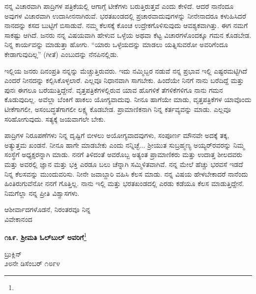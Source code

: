 ನನ್ನ ವಿಚಾರವಾಗಿ ಪಾದ್ರಿಗಳ ಪತ್ರಿಕೆಯಲ್ಲಿ ಆಗಾಗ್ಗೆ ಟೀಕೆಗಳು ಬರುತ್ತಿರುತ್ತವೆ ಎಂದು ಕೇಳಿದೆ. ಆದರೆ ನಾನೆಂದೂ ಅವುಗಳ ವಿಚಾರವಾಗಿ ಉದಾಸೀನನಾಗಿರುವೆ. ಭರತಖಂಡ\break ದಲ್ಲಿ ಪ್ರಚಾರವಾದುವುಗಳನ್ನು ನೀನೇನಾದರೂ ಕಳುಹಿಸಿದರೆ ನಾನದನ್ನು ಕಸದ ಬುಟ್ಟಿಗೆ ಬಿಸಾಡುವೆ. ನಮ್ಮ ಕೆಲಸಕ್ಕೆ ಕೊಂಚ ಉದ್ರೇಕಗೊಳಿಸುವುದು ಆವಶ್ಯಕವಾಗಿತ್ತು. ಈಗ ನಮಗೆ ಸಾಕಷ್ಟು ಆಗಿದೆ. ಜನರು ನನ್ನ ವಿಷಯವಾಗಿ ಹೇಳುವ ಒಳ್ಳೆಯ ಅಥವಾ ಕೆಟ್ಟ ವಿಚಾರಗಳೊಂದಕ್ಕೂ ಗಮನ ಕೊಡಬೇಡ. ನಿನ್ನ ಕಾರ್ಯವನ್ನು ಮಾಡುತ್ತಾ ಹೋಗು. “ಯಾರು ಒಳ್ಳೆಯದನ್ನು ಮಾಡಲು ಯತ್ನಿಸುವರೋ ಅವರಿಗೆಂದೂ ಕೇಡಾಗುವುದಿಲ್ಲ” (ಗೀತೆ) ಎಂಬುದನ್ನು ನೆನಪಿನಲ್ಲಿಡು.

ಇಲ್ಲಿಯ ಜನರು ದಿನಂಪ್ರತಿ ನನ್ನನ್ನು ಮೆಚ್ಚುತ್ತಿರುವರು. ಇದು ನಮ್ಮಿಬ್ಬರ ನಡುವೆ\enginline{-} ನನ್ನ ಪ್ರಭಾವ ಇಲ್ಲಿ ಎಷ್ಟರಮಟ್ಟಿಗಿದೆ ಎಂದರೆ ನೀನದನ್ನು ಕಲ್ಪಿಸಿಕೊಳ್ಳಲಾರೆ. ಎಲ್ಲವೂ ನಿಧಾನವಾಗಿ ಸಾಗಬೇಕು. ಹಿಂದೆಯೇ ನಿನಗೆ ನಾನು ಬರೆದಿದ್ದೆ ಮತ್ತು ಪುನಃ ಈಗಲೂ ಬರೆಯುತ್ತಿದ್ದೇನೆ. ವೃತ್ತಪತ್ರಿಕೆಗಳಲ್ಲಿರುವ ಯಾವ ಹೊಗಳಿಕೆ ತೆಗಳಿಕೆಗಳಿಗೂ ನಾನು ಗಮನ ಕೊಡುವುದಿಲ್ಲ. ಅವೆಲ್ಲಾ ಬೆಂಕಿಗೆ ಹಾಕಲು ಯೋಗ್ಯವಾದುವು. ನೀನೂ ಹಾಗೆಯೇ ಮಾಡು, ವೃತ್ತಪತ್ರಿಕೆಗಳ ಯಾವೊಂದು ಟೀಕೆಗಾಗಲೀ, ಅಸಂಬದ್ಧತೆಗಾಗಲೀ ಲಕ್ಷ್ಯ ಕೊಡಬೇಡ. ಪ್ರಾಮಾಣಿಕನಾಗಿ ನಿನ್ನ ಕರ್ತವ್ಯವನ್ನು ಮಾಡು. ಎಲ್ಲವೂ ಸರಿಹೋಗುವುದು. ಸತ್ಯಕ್ಕೆ ಜಯವಾಗಲೇ ಬೇಕು.

ಪಾದ್ರಿಗಳ ನಿರೂಪಣೆಗಳು ನಿನ್ನ ದೃಷ್ಟಿಗೆ ಬೀಳಲು ಅಯೋಗ್ಯವಾದವುಗಳು, ಸಂಪೂರ್ಣ ಮೌನವೇ ಅದಕ್ಕೆ ತಕ್ಕ, ಅತ್ಯುತ್ತಮ ಖಂಡನೆ. ನೀನೂ ಹಾಗೇ ಮಾಡಬೇಕು ಎಂದು ನನ್ನಿಚ್ಛೆ... ಶ‍್ರೀಯುತ ಸುಬ್ರಹ್ಮಣ್ಯ ಅಯ್ಯರ್‌ರವರನ್ನು ನಿಮ್ಮ ಸಂಸ್ಥೆಗೆ ಅಧ್ಯಕ್ಷರನ್ನಾಗಿ ಮಾಡು. ನನಗೆ ತಿಳಿದಂತೆ ಅವರೊಬ್ಬ ಅತ್ಯಂತ ಪ್ರಾಮಾಣಿಕರು ಮತ್ತು ಉದಾತ್ತ ಶೀಲದವರು ಮತ್ತು ಅವರಲ್ಲಿ ಜ್ಞಾನ ಮತ್ತು ಭಕ್ತಿ ಎರಡೂ ಬಲು ಚೆನ್ನಾಗಿ ಸಮ್ಮಿಳಿತವಾಗಿವೆ. ನನ್ನ ಮೇಲೆ ಹೆಚ್ಚು ಭರವಸೆ ಇಡದೆ ನಿನ್ನ ಕೆಲಸವನ್ನು ಮುಂದುವರಿಸು. ನೀನೇ ಜವಾಬ್ದಾರಿ ವಹಿಸಿ ಕೆಲಸ ಮಾಡು. ನನ್ನ ವಿಷಯ ಹೇಳಬೇಕಾದರೆ ನಾನೆಂದು ಹಿಂತಿರುಗುವೆನೋ ನನಗೆ ಗೊತ್ತಿಲ್ಲ. ನಾನು ಇಲ್ಲಿ ಮತ್ತು ಭರತಖಂಡದಲ್ಲಿ ಎರಡು ಕಡೆಯೂ ಕೆಲಸ ಮಾಡುತ್ತಿದ್ದೇನೆ. ನಿಮಗೆಲ್ಲಾ ನನ್ನ ಪ್ರೀತಿ ವಿಶ್ವಾಸಗಳು.

\vspace{-0.5cm}

{\flushright
ಆಶೀರ್ವಾದಗಳೊಡನೆ, ನಿರಂತರವೂ ನಿನ್ನ\\ವಿವೇಕಾನಂದ\par}

\begin{center}
\textbf{೧೩೯. ಶ‍್ರೀಮತಿ ಓಲ್‌ಬುಲ್‌ ಅವರಿಗೆ}\footnote{}
\end{center}

\vspace{-0.7cm}

\begin{flushright}
ಬ್ರುಕ್ಲಿನ್\\೨೮ನೇ ಡಿಸೆಂಬರ್ ೧೮೯೪
\end{flushright}

\vspace{-0.5cm}

